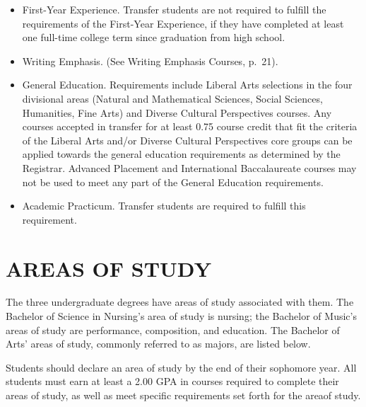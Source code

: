 \documentclass[
  letterpaper,
]{scrbook}
\providecommand{\tightlist}{%
  \setlength{\itemsep}{0pt}\setlength{\parskip}{0pt}}
\begin{document}
\begin{itemize}
\tightlist
\item
  First-Year Experience. Transfer students are not required to fulfill
  the requirements of the First-Year Experience, if they have completed
  at least one full-time college term since graduation from high school.
\item
  Writing Emphasis. (See Writing Emphasis Courses, p.~21).
\item
  General Education. Requirements include Liberal Arts selections in the
  four divisional areas (Natural and Mathematical Sciences, Social
  Sciences, Humanities, Fine Arts) and Diverse Cultural Perspectives
  courses. Any courses accepted in transfer for at least 0.75 course
  credit that fit the criteria of the Liberal Arts and/or Diverse
  Cultural Perspectives core groups can be applied towards the general
  education requirements as determined by the Registrar. Advanced
  Placement and International Baccalaureate courses may not be used to
  meet any part of the General Education requirements.
\item
  Academic Practicum. Transfer students are required to fulfill this
  requirement.
\end{itemize}

\hypertarget{areas-of-study}{%
\chapter*{AREAS OF STUDY}\label{areas-of-study}}


The three undergraduate degrees have areas of study associated with
them. The Bachelor of Science in Nursing's area of study is nursing; the
Bachelor of Music's areas of study are performance, composition, and
education. The Bachelor of Arts' areas of study, commonly referred to as
majors, are listed below.

Students should declare an area of study by the end of their sophomore
year. All students must earn at least a 2.00 GPA in courses required to
complete their areas of study, as well as meet specific requirements set
forth for the areaof study.
\end{document}
